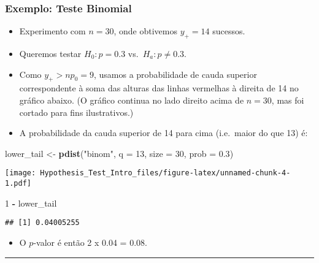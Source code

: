 \documentclass[]{article}
\newenvironment{Shaded}{\begin{snugshade}}{\end{snugshade}}
\newcommand{\KeywordTok}[1]{\textcolor[rgb]{0.13,0.29,0.53}{\textbf{#1}}}
\newcommand{\DataTypeTok}[1]{\textcolor[rgb]{0.13,0.29,0.53}{#1}}
\newcommand{\DecValTok}[1]{\textcolor[rgb]{0.00,0.00,0.81}{#1}}
\newcommand{\FloatTok}[1]{\textcolor[rgb]{0.00,0.00,0.81}{#1}}
\newcommand{\StringTok}[1]{\textcolor[rgb]{0.31,0.60,0.02}{#1}}
\newcommand{\OperatorTok}[1]{\textcolor[rgb]{0.81,0.36,0.00}{\textbf{#1}}}
\newcommand{\NormalTok}[1]{#1}
\providecommand{\tightlist}{%
  \setlength{\itemsep}{0pt}\setlength{\parskip}{0pt}}
\begin{document}
\subsubsection{Exemplo: Teste Binomial}\label{exemplo-teste-binomial}

\begin{itemize}
\tightlist
\item
  Experimento com \(n=30\), onde obtivemos \(y_+=14\) sucessos.
\item
  Queremos testar \(H_0: p=0.3\) vs.~\(H_a: p \not=0.3\).
\item
  Como \(y_+>np_0=9\), usamos a probabilidade de cauda superior
  correspondente à soma das alturas das linhas vermelhas à direita de 14
  no gráfico abaixo. (O gráfico continua no lado direito acima de
  \(n=30\), mas foi cortado para fins ilustrativos.)
\item
  A probabilidade da cauda superior de 14 para cima (i.e.~maior do que
  13) é:
\end{itemize}

\begin{Shaded}
\begin{Highlighting}[]
\NormalTok{lower_tail <-}\StringTok{ }\KeywordTok{pdist}\NormalTok{(}\StringTok{"binom"}\NormalTok{, }\DataTypeTok{q =} \DecValTok{13}\NormalTok{, }\DataTypeTok{size =} \DecValTok{30}\NormalTok{, }\DataTypeTok{prob =} \FloatTok{0.3}\NormalTok{)}
\end{Highlighting}
\end{Shaded}

\texttt{[image: Hypothesis\_Test\_Intro\_files/figure-latex/unnamed-chunk-4-1.pdf]}

\begin{Shaded}
\begin{Highlighting}[]
\DecValTok{1} \OperatorTok{-}\StringTok{ }\NormalTok{lower_tail}
\end{Highlighting}
\end{Shaded}

\begin{verbatim}
## [1] 0.04005255
\end{verbatim}

\begin{itemize}
\tightlist
\item
  O \(p\)-valor é então 2 x 0.04 = 0.08.
\end{itemize}

\begin{center}\rule{0.5\linewidth}{\linethickness}\end{center}
\end{document}

